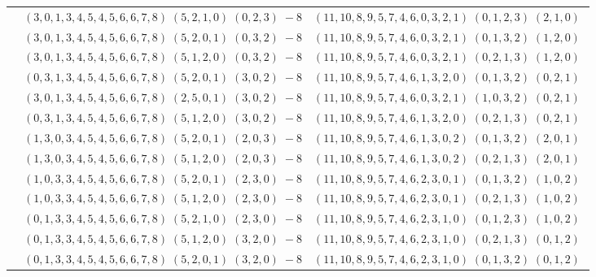 \documentclass[11pt]{article}
\begin{document}
\begin{longtable}[l]{|c|c|c|}
 \cline{2-3} 
 & $(3 ,0 ,1 ,3 ,4 ,5 ,4 ,5 ,6 ,6 ,7 ,8) \;(5 ,2 ,1 ,0) \;(0 ,2 ,3) \;-8$ & $(11 ,10 ,8 ,9 ,5 ,7 ,4 ,6 ,0 ,3 ,2 ,1) \;(0 ,1 ,2 ,3) \;(2 ,1 ,0) \;$\\ 
 \cline{2-3} 
 & $(3 ,0 ,1 ,3 ,4 ,5 ,4 ,5 ,6 ,6 ,7 ,8) \;(5 ,2 ,0 ,1) \;(0 ,3 ,2) \;-8$ & $(11 ,10 ,8 ,9 ,5 ,7 ,4 ,6 ,0 ,3 ,2 ,1) \;(0 ,1 ,3 ,2) \;(1 ,2 ,0) \;$\\ 
 \cline{2-3} 
 & $(3 ,0 ,1 ,3 ,4 ,5 ,4 ,5 ,6 ,6 ,7 ,8) \;(5 ,1 ,2 ,0) \;(0 ,3 ,2) \;-8$ & $(11 ,10 ,8 ,9 ,5 ,7 ,4 ,6 ,0 ,3 ,2 ,1) \;(0 ,2 ,1 ,3) \;(1 ,2 ,0) \;$\\ 
 \cline{2-3} 
 & $(0 ,3 ,1 ,3 ,4 ,5 ,4 ,5 ,6 ,6 ,7 ,8) \;(5 ,2 ,0 ,1) \;(3 ,0 ,2) \;-8$ & $(11 ,10 ,8 ,9 ,5 ,7 ,4 ,6 ,1 ,3 ,2 ,0) \;(0 ,1 ,3 ,2) \;(0 ,2 ,1) \;$\\ 
 \cline{2-3} 
 & $(3 ,0 ,1 ,3 ,4 ,5 ,4 ,5 ,6 ,6 ,7 ,8) \;(2 ,5 ,0 ,1) \;(3 ,0 ,2) \;-8$ & $(11 ,10 ,8 ,9 ,5 ,7 ,4 ,6 ,0 ,3 ,2 ,1) \;(1 ,0 ,3 ,2) \;(0 ,2 ,1) \;$\\ 
 \cline{2-3} 
 & $(0 ,3 ,1 ,3 ,4 ,5 ,4 ,5 ,6 ,6 ,7 ,8) \;(5 ,1 ,2 ,0) \;(3 ,0 ,2) \;-8$ & $(11 ,10 ,8 ,9 ,5 ,7 ,4 ,6 ,1 ,3 ,2 ,0) \;(0 ,2 ,1 ,3) \;(0 ,2 ,1) \;$\\ 
 \cline{2-3} 
 & $(1 ,3 ,0 ,3 ,4 ,5 ,4 ,5 ,6 ,6 ,7 ,8) \;(5 ,2 ,0 ,1) \;(2 ,0 ,3) \;-8$ & $(11 ,10 ,8 ,9 ,5 ,7 ,4 ,6 ,1 ,3 ,0 ,2) \;(0 ,1 ,3 ,2) \;(2 ,0 ,1) \;$\\ 
 \cline{2-3} 
 & $(1 ,3 ,0 ,3 ,4 ,5 ,4 ,5 ,6 ,6 ,7 ,8) \;(5 ,1 ,2 ,0) \;(2 ,0 ,3) \;-8$ & $(11 ,10 ,8 ,9 ,5 ,7 ,4 ,6 ,1 ,3 ,0 ,2) \;(0 ,2 ,1 ,3) \;(2 ,0 ,1) \;$\\ 
 \cline{2-3} 
 & $(1 ,0 ,3 ,3 ,4 ,5 ,4 ,5 ,6 ,6 ,7 ,8) \;(5 ,2 ,0 ,1) \;(2 ,3 ,0) \;-8$ & $(11 ,10 ,8 ,9 ,5 ,7 ,4 ,6 ,2 ,3 ,0 ,1) \;(0 ,1 ,3 ,2) \;(1 ,0 ,2) \;$\\ 
 \cline{2-3} 
 & $(1 ,0 ,3 ,3 ,4 ,5 ,4 ,5 ,6 ,6 ,7 ,8) \;(5 ,1 ,2 ,0) \;(2 ,3 ,0) \;-8$ & $(11 ,10 ,8 ,9 ,5 ,7 ,4 ,6 ,2 ,3 ,0 ,1) \;(0 ,2 ,1 ,3) \;(1 ,0 ,2) \;$\\ 
 \cline{2-3} 
 & $(0 ,1 ,3 ,3 ,4 ,5 ,4 ,5 ,6 ,6 ,7 ,8) \;(5 ,2 ,1 ,0) \;(2 ,3 ,0) \;-8$ & $(11 ,10 ,8 ,9 ,5 ,7 ,4 ,6 ,2 ,3 ,1 ,0) \;(0 ,1 ,2 ,3) \;(1 ,0 ,2) \;$\\ 
 \cline{2-3} 
 & $(0 ,1 ,3 ,3 ,4 ,5 ,4 ,5 ,6 ,6 ,7 ,8) \;(5 ,1 ,2 ,0) \;(3 ,2 ,0) \;-8$ & $(11 ,10 ,8 ,9 ,5 ,7 ,4 ,6 ,2 ,3 ,1 ,0) \;(0 ,2 ,1 ,3) \;(0 ,1 ,2) \;$\\ 
 \cline{2-3} 
 & $(0 ,1 ,3 ,3 ,4 ,5 ,4 ,5 ,6 ,6 ,7 ,8) \;(5 ,2 ,0 ,1) \;(3 ,2 ,0) \;-8$ & $(11 ,10 ,8 ,9 ,5 ,7 ,4 ,6 ,2 ,3 ,1 ,0) \;(0 ,1 ,3 ,2) \;(0 ,1 ,2) \;$\\ 

\end{longtable}
\end{document}
